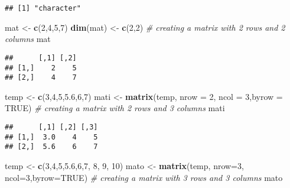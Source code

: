 \documentclass[
]{article}
\newenvironment{Shaded}{\begin{snugshade}}{\end{snugshade}}
\newcommand{\AttributeTok}[1]{\textcolor[rgb]{0.13,0.29,0.53}{#1}}
\newcommand{\CommentTok}[1]{\textcolor[rgb]{0.56,0.35,0.01}{\textit{#1}}}
\newcommand{\ConstantTok}[1]{\textcolor[rgb]{0.56,0.35,0.01}{#1}}
\newcommand{\DecValTok}[1]{\textcolor[rgb]{0.00,0.00,0.81}{#1}}
\newcommand{\FloatTok}[1]{\textcolor[rgb]{0.00,0.00,0.81}{#1}}
\newcommand{\FunctionTok}[1]{\textcolor[rgb]{0.13,0.29,0.53}{\textbf{#1}}}
\newcommand{\NormalTok}[1]{#1}
\newcommand{\OtherTok}[1]{\textcolor[rgb]{0.56,0.35,0.01}{#1}}
\begin{document}
\begin{verbatim}
## [1] "character"
\end{verbatim}

\begin{Shaded}
\begin{Highlighting}[]
\NormalTok{mat }\OtherTok{\textless{}{-}} \FunctionTok{c}\NormalTok{(}\DecValTok{2}\NormalTok{,}\DecValTok{4}\NormalTok{,}\DecValTok{5}\NormalTok{,}\DecValTok{7}\NormalTok{)}
\FunctionTok{dim}\NormalTok{(mat) }\OtherTok{\textless{}{-}} \FunctionTok{c}\NormalTok{(}\DecValTok{2}\NormalTok{,}\DecValTok{2}\NormalTok{) }\CommentTok{\# creating a matrix with 2 rows and 2 columns}
\NormalTok{mat}
\end{Highlighting}
\end{Shaded}

\begin{verbatim}
##      [,1] [,2]
## [1,]    2    5
## [2,]    4    7
\end{verbatim}

\begin{Shaded}
\begin{Highlighting}[]
\NormalTok{temp }\OtherTok{\textless{}{-}} \FunctionTok{c}\NormalTok{(}\DecValTok{3}\NormalTok{,}\DecValTok{4}\NormalTok{,}\DecValTok{5}\NormalTok{,}\FloatTok{5.6}\NormalTok{,}\DecValTok{6}\NormalTok{,}\DecValTok{7}\NormalTok{)}
\NormalTok{mati }\OtherTok{\textless{}{-}} \FunctionTok{matrix}\NormalTok{(temp, }\AttributeTok{nrow =} \DecValTok{2}\NormalTok{, }\AttributeTok{ncol =} \DecValTok{3}\NormalTok{,}\AttributeTok{byrow =} \ConstantTok{TRUE}\NormalTok{) }\CommentTok{\# creating a matrix with 2 rows and 3 columns}
\NormalTok{mati}
\end{Highlighting}
\end{Shaded}

\begin{verbatim}
##      [,1] [,2] [,3]
## [1,]  3.0    4    5
## [2,]  5.6    6    7
\end{verbatim}

\begin{Shaded}
\begin{Highlighting}[]
\NormalTok{temp }\OtherTok{\textless{}{-}} \FunctionTok{c}\NormalTok{(}\DecValTok{3}\NormalTok{,}\DecValTok{4}\NormalTok{,}\DecValTok{5}\NormalTok{,}\FloatTok{5.6}\NormalTok{,}\DecValTok{6}\NormalTok{,}\DecValTok{7}\NormalTok{, }\DecValTok{8}\NormalTok{, }\DecValTok{9}\NormalTok{, }\DecValTok{10}\NormalTok{)}
\NormalTok{mato }\OtherTok{\textless{}{-}} \FunctionTok{matrix}\NormalTok{(temp, }\AttributeTok{nrow=}\DecValTok{3}\NormalTok{, }\AttributeTok{ncol=}\DecValTok{3}\NormalTok{,}\AttributeTok{byrow=}\ConstantTok{TRUE}\NormalTok{) }\CommentTok{\# creating a matrix with 3 rows and 3 columns}
\NormalTok{mato}
\end{Highlighting}
\end{Shaded}
\end{document}

